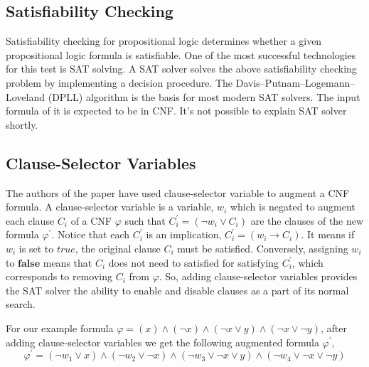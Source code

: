 \subsection{Satisfiability Checking}
Satisfiability checking for propositional logic determines whether a given propositional logic formula is satisfiable. One of the most successful technologies for this test is SAT solving.\newline
A SAT solver solves the above satisfiability checking problem by implementing a decision procedure. The Davis–Putnam–Logemann–Loveland (DPLL) algorithm is the basis for most modern SAT solvers. The input formula of it is expected to be in CNF. It's not possible to explain SAT solver shortly.
\subsection{Clause-Selector Variables}
The authors of the paper \cite{karem} have used clause-selector variable to augment a CNF formula. A clause-selector variable is a variable, $w_{i}$ which is negated to augment each clause $C_{i}$ of a CNF $\varphi$ such that $C^{\prime}_{i}=(\neg w_{i}\vee C_{i})$ are the clauses of the new formula $\varphi^{\prime}$. Notice that each $C^{\prime}_{i}$ is an implication, $C^{\prime}_{i}=(w_{i}\rightarrow C_{i})$. It means if $w_{i}$ is set to $true$, the original clause $C_{i}$ must be satisfied. Conversely, assigning $w_{i}$ to $\mathbf{false}$ means that $C_{i}$ does not need to satisfied for satisfying $C_{i}^{\prime}$, which corresponds to removing $C_{i}$ from $\varphi$. So, adding clause-selector variables provides the SAT solver the ability to enable and disable clauses as a part of its normal search.
\begin{example}
	For our example formula $\varphi=(x)\wedge(\neg x)\wedge(\neg x\vee y)\wedge(\neg x \vee \neg y)$, after adding clause-selector variables we get the following augmented formula $\varphi^{\prime}$, 
	$$\varphi^{\prime}=(\neg w_{1}\vee x)\wedge(\neg w_{2}\vee \neg x)\wedge(\neg w_{3}\vee \neg x\vee y)\wedge(\neg w_{4}\vee \neg x \vee \neg y)$$
	
\end{example}

